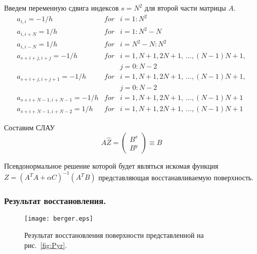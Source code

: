 \documentclass{beamer}
\begin{document}
\begin{frame}[allowframebreaks]
    \small Введем переменную сдвига индексов $s = N^2$ для второй части матрицы $A$.
    \begin{equation}
        \begin{array}{lll}
            a_{i,i} = -1/h            & for & i = 1:N^2                                       \\
            a_{i,i+N} = 1/h           & for & i = 1:N^2 - N                                   \\
            a_{i,i-N} = 1/h           & for & i = N^2 - N:N^2                                 \\
            a_{s+i+j, i+j} = -1/h     & for & i = 1, N+1, 2N+1,~\dots, (N-1)N + 1, \\
                                      & & j = 0:N-2  \\
            a_{s+i+j, i+j+1} = -1/h   & for & i = 1, N+1, 2N+1,~\dots, (N-1)N + 1, \\
                                      & & j = 0:N-2  \\
            a_{s+i+N-1, i+N-1} = -1/h & for & i = 1, N+1, 2N+1,~\dots, (N-1)N + 1             \\
            a_{s+i+N-1, i+N-2} = 1/h  & for & i = 1, N+1, 2N+1,~\dots, (N-1)N + 1
        \end{array}
    \end{equation}

    \newpage
    Составим СЛАУ
    \begin{equation}
        \label{eq:SLAE}
        A \hat{Z} = \left(
            \begin{array}{l}
                B^x \\
                B^y
            \end{array}
        \right)
        \equiv{} B
    \end{equation}

    Псевдонормальное решение которой будет являться искомая функция $Z = {( A^T A + \alpha C)}^{-1} ( A^T B) $ представляющая восстанавливаемую поверхность.
\end{frame}



\begin{frame}
    \frametitle{Результат восстановления.}
    \begin{figure}
        \texttt{[image: berger.eps]}
        \caption{Результат восстановления поверхности представленной на рис.~\ref{fig:Pyr}.}
        {\label{fig:berger}}%
    \end{figure}
\end{frame}
\end{document}
